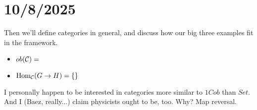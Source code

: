 \section*{10/8/2025}



Then we'll define categories in general, and discuss how our big three examples fit in the framework.



\begin{definition}
    
\end{definition}



\begin{example}[Groups]
    
    \begin{itemize}
        \item $ob(\mathcal{C}) = $
        \item $\operatorname{Hom}_{\mathcal{C}}(G\to H) = \{\}$
    \end{itemize}
\end{example}


\begin{example}
    
\end{example}


\begin{example}[1-Cobordisms]
    
\end{example}


\begin{example}[Sets]
    
\end{example}


I personally happen to be interested in categories more similar to $1Cob$ than $Set$.
And I (Baez, really...) claim physicists ought to be, too.
Why?
Map reversal.


